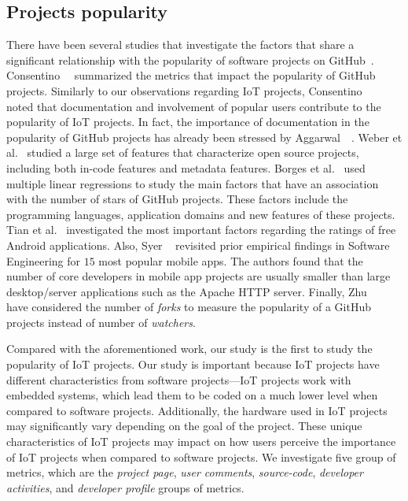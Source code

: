 \subsection{Projects popularity}

There have been several studies that investigate the factors that share a
significant relationship with the popularity of software projects on
GitHub~\cite{weber2014makes,borges2016understanding,tian2015characteristics,syer2013revisiting,cosentino2017systematic,aggarwal2014co,zhu2014patterns}.
Consentino~\etal~\cite{cosentino2017systematic} summarized the metrics that
impact the popularity of GitHub projects. Similarly to our observations regarding
IoT projects, Consentino~\etal~\cite{cosentino2017systematic} noted that
documentation and involvement of popular users contribute to the popularity of
IoT projects. In fact, the importance of documentation in the popularity of
GitHub projects has already been stressed by Aggarwal~\etal~\cite{aggarwal2014co}.
Weber et al.~\cite{weber2014makes} studied a large set of features that
characterize open source projects, including both in-code features and metadata
features.  Borges et al.~\cite{borges2016understanding} used multiple linear
regressions to study the main factors that have an association with the number
of stars of GitHub projects. These factors include the programming languages,
application domains and new features of these projects. Tian et
al.~\cite{tian2015characteristics} investigated the most important factors
regarding the ratings of free Android applications.  Also, Syer
\etal~\cite{syer2013revisiting} revisited prior empirical findings in Software
Engineering for $15$ most popular mobile apps. The authors found that the
number of core developers in mobile app projects are usually smaller than large
desktop/server applications such as the Apache HTTP server. Finally,
Zhu~\etal~\cite{zhu2014patterns} have considered the number of {\em forks} to
measure the popularity of a GitHub projects instead of number of {\em
watchers}.

Compared with the aforementioned work, our study is the first to study the
popularity of IoT projects. Our study is important because IoT projects have
different characteristics from software projects---IoT projects work with
embedded systems, which lead them to be coded on a much lower level when
compared to software projects. Additionally, the hardware used in IoT projects
may significantly vary depending on the goal of the project. These unique
characteristics of IoT projects may impact on how users perceive the importance
of IoT projects when compared to software projects. We investigate five group
of metrics, which are the {\em project page}, {\em user comments}, {\em
source-code}, {\em developer activities}, and {\em developer profile} groups of
metrics. 

